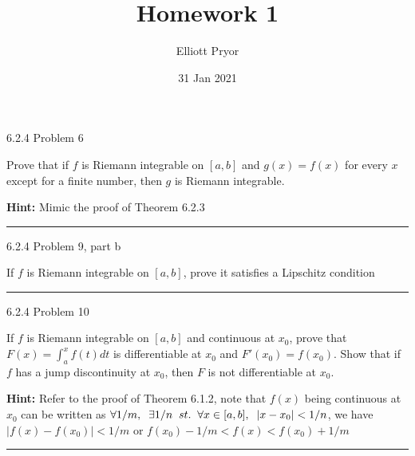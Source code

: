 \documentclass[11pt]{article}
\title{Homework 1}
\author{Elliott Pryor}
\date{31 Jan 2021}
\begin{document}
\maketitle

 6.2.4 Problem 6

Prove that if $f$ is Riemann integrable on $[a, b]$ and $g(x) = f(x)$ for
every $x$ except for a finite number, then $g$ is Riemann integrable.

\textbf{Hint:} Mimic the proof of Theorem 6.2.3

\hrule





 6.2.4 Problem 9, part b

If $f$ is Riemann integrable on $[a, b]$, prove it satisfies a Lipschitz condition

\hrule




 6.2.4 Problem 10

If $f$ is Riemann integrable on $[a, b]$ and continuous at $x_0$, prove
that $F(x) = \int_a ^x f(t) dt$ is differentiable at $x_0$ and $F'(x_0) = f(x_0)$.
Show that if $f$ has a jump discontinuity at $x_0$, then $F$ is not
differentiable at $x_0$. 

\textbf{Hint: } Refer to the proof of Theorem 6.1.2, note that $f(x)$ being continuous at $x_0$
can be written as $\forall 1/m, \sp \exists 1/n \sp st. \sp \forall x \in [a,b], \sp |x - x_0| < 1/n$, we have $|f(x) - f(x_0)| < 1/m$
or $f(x_0) - 1/m < f(x) < f(x_0) + 1/m$
\hrule
\end{document}
